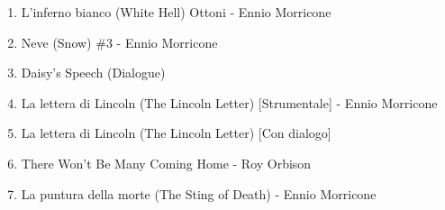 \documentclass[12pt]{article} %
\begin{document}
\begin{enumerate}
                                \item L'inferno bianco (White Hell) Ottoni - Ennio Morricone
                                \item Neve (Snow) \#3 - Ennio Morricone
                                \item Daisy’s Speech (Dialogue)
                                \item La lettera di Lincoln (The Lincoln Letter) [Strumentale] - Ennio Morricone
                                \item La lettera di Lincoln (The Lincoln Letter) [Con dialogo]
                                \item There Won’t Be Many Coming Home - Roy Orbison
                                \item La puntura della morte (The Sting of Death) - Ennio Morricone
                            \end{enumerate}

                            \normalsize
\end{document}
